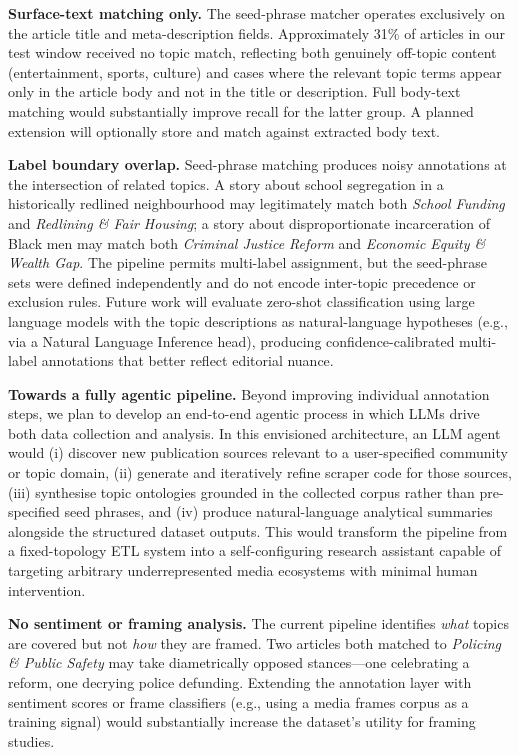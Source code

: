\documentclass[sigconf,anonymous]{acmart}
\begin{document}
\noindent\textbf{Surface-text matching only.}
The seed-phrase matcher operates exclusively on the article title and
meta-description fields.
Approximately 31\% of articles in our test window received no topic match,
reflecting both genuinely off-topic content (entertainment, sports, culture) and
cases where the relevant topic terms appear only in the article body and not in
the title or description.
Full body-text matching would substantially improve recall for the latter group.
A planned extension will optionally store and match against extracted body text.

\noindent\textbf{Label boundary overlap.}
Seed-phrase matching produces noisy annotations at the intersection of related
topics.
A story about school segregation in a historically redlined neighbourhood may
legitimately match both \emph{School Funding} and \emph{Redlining \& Fair
Housing}; a story about disproportionate incarceration of Black men may match
both \emph{Criminal Justice Reform} and \emph{Economic Equity \& Wealth Gap}.
The pipeline permits multi-label assignment, but the seed-phrase sets were
defined independently and do not encode inter-topic precedence or exclusion
rules.
Future work will evaluate zero-shot classification using large language models
with the topic descriptions as natural-language hypotheses
(e.g., via a Natural Language Inference head), producing confidence-calibrated
multi-label annotations that better reflect editorial nuance.

\noindent\textbf{Towards a fully agentic pipeline.}
Beyond improving individual annotation steps, we plan to develop an end-to-end
agentic process in which LLMs drive both data collection and analysis.
In this envisioned architecture, an LLM agent would (i) discover new
publication sources relevant to a user-specified community or topic domain,
(ii) generate and iteratively refine scraper code for those sources,
(iii) synthesise topic ontologies grounded in the collected corpus rather than
pre-specified seed phrases, and (iv) produce natural-language analytical
summaries alongside the structured dataset outputs.
This would transform the pipeline from a fixed-topology ETL system into a
self-configuring research assistant capable of targeting arbitrary
underrepresented media ecosystems with minimal human intervention.

\noindent\textbf{No sentiment or framing analysis.}
The current pipeline identifies \emph{what} topics are covered but not
\emph{how} they are framed.
Two articles both matched to \emph{Policing \& Public Safety} may take
diametrically opposed stances---one celebrating a reform, one decrying police
defunding.
Extending the annotation layer with sentiment scores or frame classifiers
(e.g., using a media frames corpus as a training signal) would substantially
increase the dataset's utility for framing studies.
\end{document}
